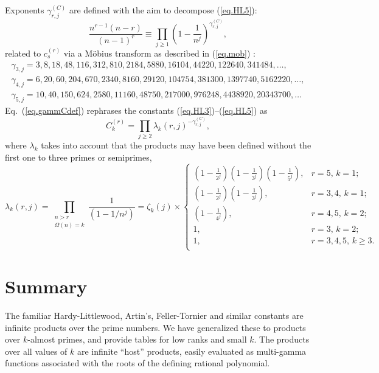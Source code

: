 \documentclass{amsart}
\begin{document}
Exponents $\gamma_{r,j}^{(C)}$ are defined
with the aim to decompose (\ref{eq.HL5}):
\begin{equation}
\frac{n^{r-1}(n-r)}{(n-1)^r}
\equiv \prod_{j\ge 1}
\left(1-\frac{1}{n^j}\right)^{\gamma_{r,j}^{(C)}}
,
\label{eq.gammCdef}
\end{equation}
related to $c_s^{(r)}$ via a M\"obius
transform as described in (\ref{eq.mob}) \cite{Niklasch}:
\begin{gather*}
\gamma_{3,j} = 3, 8, 18, 48, 116, 312, 810, 2184, 5880, 16104, 44220, 122640, 341484,\ldots,
\\
\gamma_{4,j} = 6, 20, 60, 204, 670, 2340, 8160, 29120, 104754, 381300, 1397740, 5162220,\ldots ,
\\
\gamma_{5,j} = 10, 40, 150, 624, 2580, 11160, 48750, 217000, 976248, 4438920, 20343700,\ldots
\end{gather*}
Eq.\ (\ref{eq.gammCdef}) rephrases the constants (\ref{eq.HL3})--(\ref{eq.HL5})
as
\begin{equation}
C_k^{(r)}=\prod_{j\ge 2} \lambda_k(r,j)^{-\gamma_{r,j}^{(C)}},
\end{equation}
where $\lambda_k$
takes into account that the products may have been defined
without the first one to three primes or semiprimes,
\begin{equation}
\lambda_k(r,j)=
\prod\limits_{\substack{n> r\\ \Omega(n)=k}}
\displaystyle \frac{1}{ (1-1/n^j)}
=
\zeta_k(j)\times \left\{
\begin{array}{ll}
(1-\frac{1}{2^j})(1-\frac{1}{3^j})(1-\frac{1}{5^j}), & r=5,\, k=1  ; \\
(1-\frac{1}{2^j})(1-\frac{1}{3^j}), & r=3,4,\, k=1;  \\
(1-\frac{1}{4^j}), & r=4,5,\, k=2;   \\
1, & r=3,\, k=2;   \\
1, & r=3,4,5,\, k\ge 3. \\
\end{array}
\right.
\end{equation}

\section{Summary}
The familiar Hardy-Littlewood, Artin's, Feller-Tornier and similar
constants are infinite products over the prime numbers. We have
generalized these to products over $k$-almost primes, and provide
tables
for low ranks and small
$k$.
The products over all values of $k$ are infinite ``host'' products,
easily evaluated as multi-gamma functions associated
with the roots of the defining rational polynomial.
\end{document}
